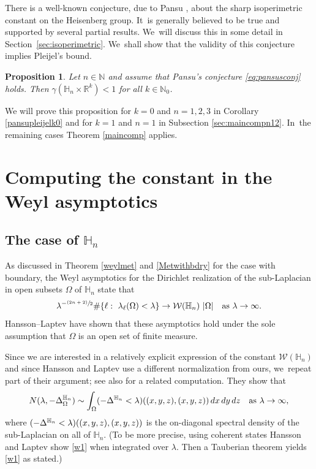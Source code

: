 \documentclass[11pt]{article}
\let\oldsfrac\sfrac
\renewcommand{\sfrac}[2]{{\oldsfrac{#1}{#2}}}
\newcommand{\psfrac}[2]{{\sfrac{(#1)}{#2}}}
\newtheorem{proposition}[theorem]{Proposition}
\theoremstyle{definition}
\newcommand{\1}{\mathbbm{1}}
\newcommand{\N}{\mathbb{N}}
\newcommand{\R}{\mathbb{R}}
\numberwithin{equation}{section}
\begin{document}
There is a well-known conjecture, due to Pansu \cite{Pa2}, about the sharp isoperimetric constant on the Heisenberg group. It~is generally believed to be true and supported by several partial results. We~will discuss this in some detail in Section~\ref{sec:isoperimetric}. We~shall show that the validity of this conjecture implies Pleijel's bound.

\begin{proposition}\label{pansupleijel}
Let $n\in\N$ and assume that Pansu's conjecture \eqref{eq:pansusconj} holds. Then $\gamma(\mathbb H_n\times\R^k)<1$ for all $k\in\N_0$.
\end{proposition}

We will prove this proposition for $k=0$ and $n=1,2,3$ in Corollary \ref{pansupleijelk0} and for $k=1$ and $n=1$ in Subsection \ref{sec:maincompn12}. In~the remaining cases Theorem \ref{maincomp} applies.

\section{Computing the constant in the Weyl asymptotics}\label{sec:weylhnrk}

\subsection{The case of $\mathbb H_n$}\label{sec:weylheis1}
As discussed in Theorem \ref{weylmet} and \eqref{Metwithbdry} for the case with boundary, the Weyl asymptotics for the Dirichlet realization of the sub-Laplacian in open subsets $\Omega$ of $\mathbb H_n$ state that
\[
\lambda^{-\psfrac{2n+2}{2}} \#\{ \ell:\ \lambda_\ell(\Omega)<\lambda \} \to \mathcal W(\mathbb H_n) \ |\Omega|
\quad\text{as}\ \lambda\to\infty.
\]
Hansson--Laptev \cite{HL} have shown that these asymptotics hold under the sole assumption that $\Omega$ is an open set of finite measure.

Since we are interested in a relatively explicit expression of the constant $\mathcal W(\mathbb H_n)$ and since Hansson and Laptev use a different normalization from ours, we~repeat part of their argument; see also \cite{St} for a related computation. They show that
\begin{equation}\label{w1}
N(\lambda,-\Delta_\Omega^{\mathbb H_n}) \sim \int_\Omega \1(-\Delta^{\mathbb H_n} <\lambda)((x,y,z),(x,y,z)) \,dx\,dy\,dz
\quad\text{as}\ \lambda\to\infty,
\end{equation}
where $\1(-\Delta^{\mathbb H_n} <\lambda)((x,y,z),(x,y,z))$ is the on-diagonal spectral density of the sub-Laplacian on all of $\mathbb H_n$. (To be more precise, using coherent states Hansson and Laptev show \eqref{w1} when integrated over $\lambda$. Then a Tauberian theorem yields \eqref{w1} as stated.)
\end{document}
